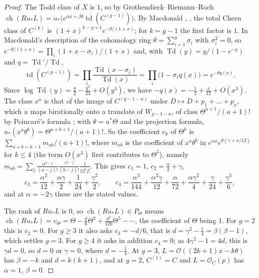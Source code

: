 \documentclass[11pt,reqno]{amsart}
\theoremstyle{plain}
\theoremstyle{definition}
\theoremstyle{remark}
\newcommand{\cO}{\mathcal{O}}
\DeclareMathOperator{\ch}{ch}
\begin{document}
\begin{proof}
The Todd class of $X$ is $1$, so by Grothendieck--Riemann--Roch
$\ch(Ru_{*}L)=u_{*}\bigl(e^{\alpha x+\beta\theta}\operatorname{td}(C^{(g-1)})\bigr)$.
By Macdonald \cite{Mac62}, \cite[Chapter~VII, Section~5]{ACGH85}, the total
Chern class of $C^{(k)}$ is $(1+x)^{k-g+1}e^{-\theta/(1+x)}$; for $k=g-1$ the
first factor is $1$. In Macdonald's description of the cohomology ring
$\theta=\sum_{i=1}^{g}\sigma_{i}$ with $\sigma_{i}^{2}=0$, so
$e^{-\theta/(1+x)}=\prod_{i}(1+x-\sigma_{i})/(1+x)$ and, with
$\operatorname{Td}(y)=y/(1-e^{-y})$ and $q=\operatorname{Td}'/\operatorname{Td}$,
\[
  \operatorname{td}(C^{(g-1)})=\prod_{i}\frac{\operatorname{Td}(x-\sigma_{i})}
  {\operatorname{Td}(x)}=\prod_{i}\bigl(1-\sigma_{i}q(x)\bigr)
  =e^{-\theta q(x)}.
\]
Since $\log\operatorname{Td}(y)=\frac y2-\frac{y^{2}}{24}+O(y^{4})$, we have
$-q(x)=-\frac12+\frac{x}{12}+O(x^{3})$. The class $x^{a}$ is that of the image
of $C^{(g-1-a)}$ under $D\mapsto D+p_{1}+\dots+p_{a}$, which $u$ maps
birationally onto a translate of $W_{g-1-a}$, of class
$\Theta^{a+1}/(a+1)!$ by Poincar\'e's formula
\cite[Chapter~I, Section~5]{ACGH85}; with $\theta=u^{*}\Theta$ and the projection
formula, $u_{*}(x^{a}\theta^{b})=\Theta^{a+b+1}/(a+1)!$. So the coefficient
$c_{k}$ of $\Theta^{k}$ is $\sum_{a+b=k-1}m_{ab}/(a+1)!$, where $m_{ab}$ is the
coefficient of $x^{a}\theta^{b}$ in $e^{\alpha x}e^{\theta(\gamma+x/12)}$ for
$k\le4$ (the term $O(x^{3})$ first contributes to $\Theta^{5}$), namely
$m_{ab}=\sum_{j}\frac{\alpha^{a-j}}{(a-j)!}\frac{\gamma^{b-j}}{(b-j)!}
\frac{1}{12^{j}j!}$. This gives $c_{1}=1$, $c_{2}=\frac{\alpha}{2}+\gamma$,
\[
  c_{3}=\frac{\alpha^{2}}{12}+\frac{\alpha\gamma}{2}+\frac{1}{24}+\frac{\gamma^{2}}{2},
  \qquad
  c_{4}=\frac{\alpha^{3}}{144}+\frac{\alpha^{2}\gamma}{12}+\frac{\alpha}{72}
  +\frac{\alpha\gamma^{2}}{4}+\frac{\gamma}{24}+\frac{\gamma^{3}}{6},
\]
and at $\alpha=-2\gamma$ these are the stated values.

The rank of $Ru_{*}L$ is $0$, so $\ch(Ru_{*}L)\in P_{\Theta}$ means
$\ch(Ru_{*}L)=v_{\Theta}=\Theta-\frac d6\Theta^{3}+\frac{d^{2}}{120}\Theta^{5}-\cdots$,
the coefficient of $\Theta$ being $1$. For $g=2$ this is $c_{2}=0$. For
$g\ge3$ it also asks $c_{3}=-d/6$, that is $d=\gamma^{2}-\frac14=\beta(\beta-1)$,
which settles $g=3$. For $g\ge4$ it asks in addition $c_{4}=0$; as
$4\gamma^{2}-1=4d$, this is $\gamma d=0$, so $d=0$ or $\gamma=0$, where
$d=-\frac14$. At $g=3$, $L=\cO((2k+1)x-k\theta)$ has $\beta=-k$ and
$d=k(k+1)$, and at $g=2$, $C^{(1)}=C$ and $L=\cO_{C}(p)$ has $\alpha=1$,
$\beta=0$.
\end{proof}
\end{document}
